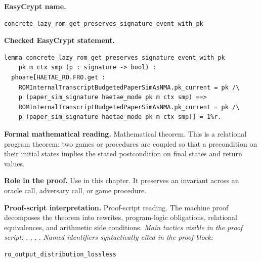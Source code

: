 \begin{formaltheorem}
\noindent\textbf{EasyCrypt name.}
\begin{lstlisting}[language=EasyCrypt,basicstyle=\ttfamily\scriptsize]
concrete_lazy_rom_get_preserves_signature_event_with_pk
\end{lstlisting}
\noindent\textbf{Checked EasyCrypt statement.}
\begin{lstlisting}[language=EasyCrypt,basicstyle=\ttfamily\scriptsize]
lemma concrete_lazy_rom_get_preserves_signature_event_with_pk
    pk m ctx smp (p : signature -> bool) :
  phoare[HAETAE_RO.FRO.get :
    ROMInternalTranscriptBudgetedPaperSimAsNMA.pk_current = pk /\
    p (paper_sim_signature haetae_mode pk m ctx smp) ==>
    ROMInternalTranscriptBudgetedPaperSimAsNMA.pk_current = pk /\
    p (paper_sim_signature haetae_mode pk m ctx smp)] = 1%r.
\end{lstlisting}
\noindent\textbf{Formal mathematical reading.}
Mathematical theorem. This is a relational program theorem: two games or procedures are coupled so that a precondition on their initial states implies the stated postcondition on final states and return values.

\noindent\textbf{Role in the proof.}
Use in this chapter. It preserves an invariant across an oracle call, adversary call, or game procedure.

\noindent\textbf{Proof-script interpretation.}
Proof-script reading. The machine proof decomposes the theorem into rewrites, program-logic obligations, relational equivalences, and arithmetic side conditions.
\emph{Main tactics visible in the proof script:} , , , .
\emph{Named identifiers syntactically cited in the proof block:}
\begin{lstlisting}[language=EasyCrypt,basicstyle=\ttfamily\scriptsize]
ro_output_distribution_lossless
\end{lstlisting}

\end{formaltheorem}

